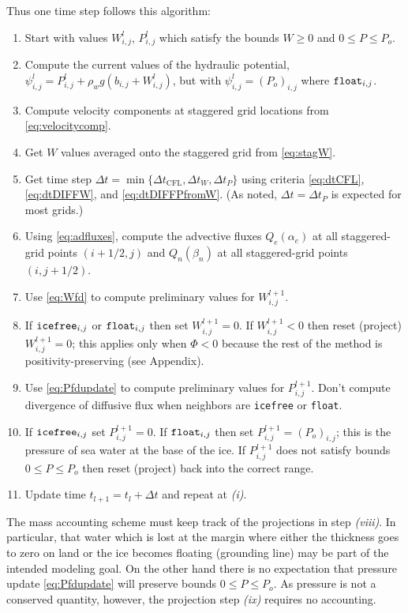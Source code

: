 \documentclass[11pt,final]{amsart}%
\newcommand{\Wlij}{W^l_{i,j}}
\newcommand{\Plij}{P^l_{i,j}}
\begin{document}
Thus one time step follows this algorithm:
\renewcommand{\labelenumi}{\emph{(\roman{enumi})}}
\begin{enumerate}
\item Start with values $\Wlij$, $\Plij$ which satisfy the bounds $W\ge 0$ and $0 \le P \le P_o$.
\item Compute the current values of the hydraulic potential, $\psi_{i,j}^l = \Plij + \rho_w g(b_{i,j} + \Wlij)$, but with $\psi_{i,j}^l=(P_o)_{i,j}$ where $\text{\texttt{float}}_{i,j}$.
\item Compute velocity components at staggered grid locations from \eqref{eq:velocitycomp}.   %
\item Get $W$ values averaged onto the staggered grid from \eqref{eq:stagW}.
\item Get time step $\Delta t = \min\{\Delta t_{\text{CFL}}, \Delta t_W, \Delta t_P\}$ using criteria \eqref{eq:dtCFL}, \eqref{eq:dtDIFFW}, and \eqref{eq:dtDIFFPfromW}.  (As noted, $\Delta t = \Delta t_P$ is expected for most grids.)
\item Using \eqref{eq:adfluxes}, compute the advective fluxes $Q_e(\alpha_e)$ at all staggered-grid points $(i+1/2,j)$ and $Q_n(\beta_n)$ at all staggered-grid points $(i,j+1/2)$.  
\item Use \eqref{eq:Wfd} to compute preliminary values for $W_{i,j}^{l+1}$.
\item If $\text{\texttt{icefree}}_{i,j}$ or $\text{\texttt{float}}_{i,j}$ then set $W_{i,j}^{l+1}=0$.  If $W_{i,j}^{l+1}<0$ then reset (project) $W_{i,j}^{l+1}=0$; this applies only when $\Phi<0$ because the rest of the method is positivity-preserving (see Appendix).
\item Use \eqref{eq:Pfdupdate} to compute preliminary values for $P_{i,j}^{l+1}$.  Don't compute divergence of diffusive flux when neighbors are \texttt{icefree} or \texttt{float}.
\item If $\text{\texttt{icefree}}_{i,j}$ set $P_{i,j}^{l+1}=0$.  If $\text{\texttt{float}}_{i,j}$ then set $P_{i,j}^{l+1} = (P_o)_{i,j}$; this is the pressure of sea water at the base of the ice.  If $P_{i,j}^{l+1}$ does not satisfy bounds $0 \le P \le P_o$ then reset (project) back into the correct range.
\item Update time $t_{l+1}=t_l+\Delta t$ and repeat at \emph{(i)}.
\end{enumerate}
The mass accounting scheme must keep track of the projections in step \emph{(viii)}.  In particular, that water which is lost at the margin where either the thickness goes to zero on land or the ice becomes floating (grounding line) may be part of the intended modeling goal.  On the other hand there is no expectation that pressure update \eqref{eq:Pfdupdate} will preserve bounds $0\le P \le P_o$.  As pressure is not a conserved quantity, however, the projection step \emph{(ix)} requires no accounting.
\end{document}
